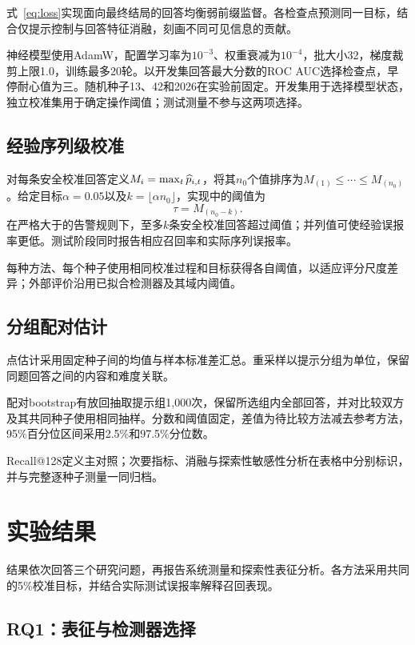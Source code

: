 式~\ref{eq:loss}实现面向最终结局的回答均衡弱前缀监督。各检查点预测同一目标，结合仅提示控制与回答特征消融，刻画不同可见信息的贡献。

神经模型使用AdamW，配置学习率为$10^{-3}$、权重衰减为$10^{-4}$，批大小32，梯度裁剪上限1.0，训练最多20轮。以开发集回答最大分数的ROC AUC选择检查点，早停耐心值为三。随机种子13、42和2026在实验前固定。开发集用于选择模型状态，独立校准集用于确定操作阈值；测试测量不参与这两项选择。

\subsection{经验序列级校准}
对每条安全校准回答定义$M_i=\max_t\widehat p_{i,t}$，将其$n_0$个值排序为$M_{(1)}\leq\cdots\leq M_{(n_0)}$。给定目标$\alpha=0.05$以及$k=\lfloor\alpha n_0\rfloor$，实现中的阈值为
\begin{equation*}
 \tau=M_{(n_0-k)}.
\end{equation*}
在严格大于的告警规则下，至多$k$条安全校准回答超过阈值；并列值可使经验误报率更低。测试阶段同时报告相应召回率和实际序列误报率。

每种方法、每个种子使用相同校准过程和目标获得各自阈值，以适应评分尺度差异；外部评价沿用已拟合检测器及其域内阈值。

\subsection{分组配对估计}
点估计采用固定种子间的均值与样本标准差汇总。重采样以提示分组为单位，保留同题回答之间的内容和难度关联。

配对bootstrap有放回抽取提示组1,000次，保留所选组内全部回答，并对比较双方及其共同种子使用相同抽样。分数和阈值固定，差值为待比较方法减去参考方法，95\%百分位区间采用2.5\%和97.5\%分位数。

Recall@128定义主对照；次要指标、消融与探索性敏感性分析在表格中分别标识，并与完整逐种子测量一同归档。

\section{实验结果}\label{sec:results}
结果依次回答三个研究问题，再报告系统测量和探索性表征分析。各方法采用共同的5\%校准目标，并结合实际测试误报率解释召回表现。
\subsection{RQ1：表征与检测器选择}



